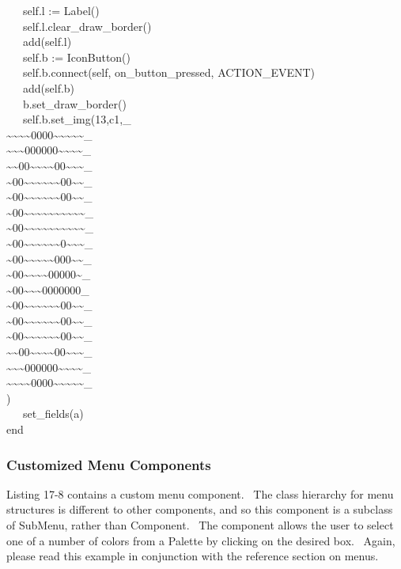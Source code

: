 {\>   \ \ \ self.l := Label() \\
\>   \ \ \ self.l.clear\_draw\_border() \\
\>   \ \ \ add(self.l) \\
\>   \ \ \ self.b := IconButton() \\
\>   \ \ \ self.b.connect(self,
{\textquotedbl}on\_button\_pressed{\textquotedbl}, ACTION\_EVENT) \\
\>   \ \ \ add(self.b) \\
\>   \ \ \ b.set\_draw\_border() \\
\>   \ \ \ self.b.set\_img({\textquotedbl}13,c1,\_ \\
\~{}\~{}\~{}\~{}0000\~{}\~{}\~{}\~{}\~{}\_ \\
\~{}\~{}\~{}000000\~{}\~{}\~{}\~{}\_ \\
\~{}\~{}00\~{}\~{}\~{}\~{}00\~{}\~{}\~{}\_ \\
\~{}00\~{}\~{}\~{}\~{}\~{}\~{}00\~{}\~{}\_ \\
\~{}00\~{}\~{}\~{}\~{}\~{}\~{}00\~{}\~{}\_ \\
\~{}00\~{}\~{}\~{}\~{}\~{}\~{}\~{}\~{}\~{}\~{}\_ \\
\~{}00\~{}\~{}\~{}\~{}\~{}\~{}\~{}\~{}\~{}\~{}\_ \\
\~{}00\~{}\~{}\~{}\~{}\~{}\~{}0\~{}\~{}\~{}\_ \\
\~{}00\~{}\~{}\~{}\~{}\~{}000\~{}\~{}\_ \\
\~{}00\~{}\~{}\~{}\~{}00000\~{}\_ \\
\~{}00\~{}\~{}\~{}0000000\_ \\
\~{}00\~{}\~{}\~{}\~{}\~{}\~{}00\~{}\~{}\_ \\
\~{}00\~{}\~{}\~{}\~{}\~{}\~{}00\~{}\~{}\_ \\
\~{}00\~{}\~{}\~{}\~{}\~{}\~{}00\~{}\~{}\_ \\
\~{}\~{}00\~{}\~{}\~{}\~{}00\~{}\~{}\~{}\_ \\
\~{}\~{}\~{}000000\~{}\~{}\~{}\~{}\_ \\
\~{}\~{}\~{}\~{}0000\~{}\~{}\~{}\~{}\~{}\_ \\
{\textquotedbl}) \\
\>   \ \ \ set\_fields(a) \\
end
}

\subsubsection{Customized Menu Components}

Listing 17-8 contains a custom menu component. \ The class hierarchy for
menu structures is different to other components, and so this component
is a subclass of \textsf{SubMenu}, rather than
\textsf{Component}. \ The component allows the user to select one of a
number of colors from a Palette by clicking on the desired box.
\ Again, please read this example in conjunction with the reference
section on menus.

